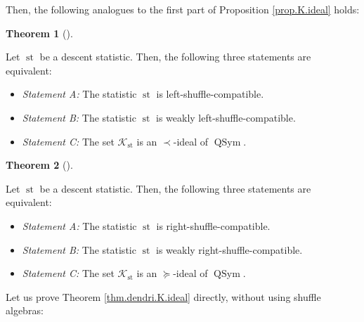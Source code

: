 \documentclass[numbers=enddot,12pt,final,onecolumn,notitlepage]{scrartcl}%
\theoremstyle{definition}
\newtheorem{theo}{Theorem}[section]
\newenvironment{theorem}[1][]
{\begin{theo}[#1]\begin{leftbar}}
{\end{leftbar}\end{theo}}
\begin{document}
Then, the following analogues to the first part of Proposition
\ref{prop.K.ideal} holds:

\begin{theorem}
\label{thm.dendri.K.ideal}Let $\operatorname*{st}$ be a descent statistic.
Then, the following three statements are equivalent:

\begin{itemize}
\item \textit{Statement A:} The statistic $\operatorname*{st}$ is left-shuffle-compatible.

\item \textit{Statement B:} The statistic $\operatorname*{st}$ is weakly left-shuffle-compatible.

\item \textit{Statement C:} The set $\mathcal{K}_{\operatorname*{st}}$ is an
$\left.  \prec\right.  $-ideal of $\operatorname*{QSym}$.
\end{itemize}
\end{theorem}

\begin{theorem}
\label{thm.dendri.K.ideal-R}Let $\operatorname*{st}$ be a descent statistic.
Then, the following three statements are equivalent:

\begin{itemize}
\item \textit{Statement A:} The statistic $\operatorname*{st}$ is right-shuffle-compatible.

\item \textit{Statement B:} The statistic $\operatorname*{st}$ is weakly right-shuffle-compatible.

\item \textit{Statement C:} The set $\mathcal{K}_{\operatorname*{st}}$ is an
$\left.  \succeq\right.  $-ideal of $\operatorname*{QSym}$.
\end{itemize}
\end{theorem}

Let us prove Theorem \ref{thm.dendri.K.ideal} directly, without using shuffle algebras:
\end{document}
